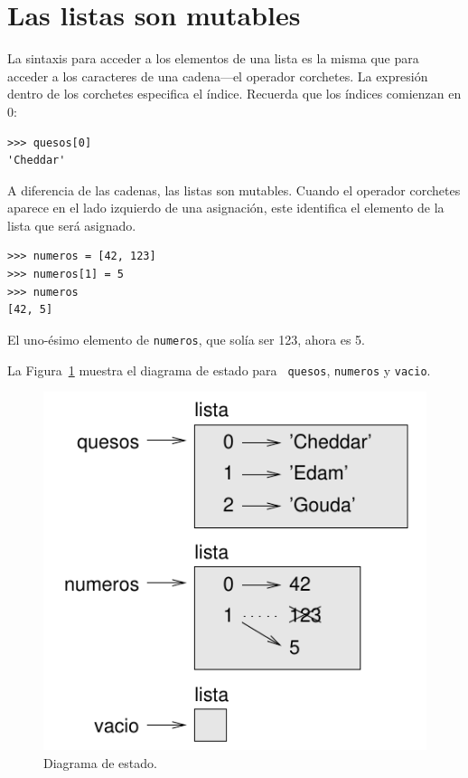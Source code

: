 \documentclass[10pt]{book}
\begin{document}
\section{Las listas son mutables}
\label{mutable}

La sintaxis para acceder a los elementos de una lista es la misma que para
acceder a los caracteres de una cadena---el operador corchetes.  La
expresión dentro de los corchetes especifica el índice.  Recuerda que los
índices comienzan en 0:

\begin{verbatim}
>>> quesos[0]
'Cheddar'
\end{verbatim}
%
A diferencia de las cadenas, las listas son mutables.  Cuando el operador corchetes aparece
en el lado izquierdo de una asignación, este identifica el elemento de la
lista que será asignado.

\begin{verbatim}
>>> numeros = [42, 123]
>>> numeros[1] = 5
>>> numeros
[42, 5]
\end{verbatim}
%
El uno-ésimo elemento de {\tt numeros}, que
solía ser 123, ahora es 5.

La Figura~\ref{fig.liststate} muestra
el diagrama de estado para {\tt
quesos}, {\tt numeros} y {\tt vacio}.

\begin{figure}
\centerline
{\includegraphics[scale=0.8]{figs/liststate.pdf}}
\caption{Diagrama de estado.}
\label{fig.liststate}
\end{figure}
\end{document}
